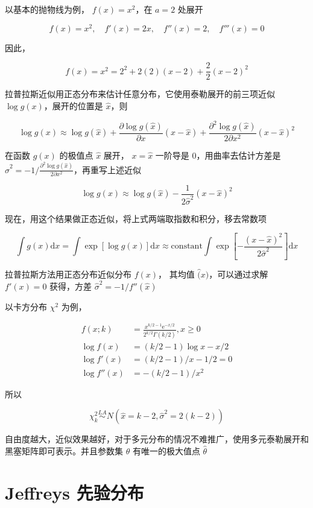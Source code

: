 \documentclass[12pt,a4paper,UTF8,twoside]{book}
\theoremstyle{definition}
\theoremstyle{definition}
\theoremstyle{definition}
\theoremstyle{remark}
\begin{document}
以基本的抛物线为例， \(f(x) = x^2\)，在 \(a = 2\) 处展开

\[ f(x) = x^2, \quad f'(x) = 2x, \quad f''(x) = 2, \quad f'''(x) = 0 \]

因此，

\[ f(x) = x^2 = 2^2 + 2(2)(x-2) + \frac{2}{2}(x-2)^2 \]

拉普拉斯近似用正态分布来估计任意分布，它使用泰勒展开的前三项近似
\(\log g(x)\)，展开的位置是 \(\hat{x}\)，则

\[
\log g(x) \approx \log g(\hat{x}) + \frac{\partial \log g(\hat{x})}{\partial x} (x - \hat{x}) + \frac{\partial^2 \log g(\hat{x})}{2\partial x^2} (x - \hat{x})^2
\]

在函数 \(g(x)\) 的极值点 \(\hat{x}\) 展开， \(x = \hat{x}\) 一阶导是
0，用曲率去估计方差是
\(\hat{\sigma}^2 = -1/\frac{\partial^2 \log g(\hat{x})}{2\partial x^2}\)，再重写上述近似

\[ \log g(x) \approx \log g(\hat{x}) - \frac{1}{2\hat{\sigma}^2} (x - \hat{x})^2 \]

现在，用这个结果做正态近似，将上式两端取指数和积分，移去常数项

\[
\int g(x) \mathrm{d}x = \int \exp[\log g(x)] \mathrm{d}x \approx \mathrm{constant} \int \exp[- \frac{(x - \hat{x})^2}{2\hat{\sigma}^2}] \mathrm{d}x
\]

拉普拉斯方法用正态分布近似分布 \(f(x)\)， 其均值
\(\hat(x)\)，可以通过求解 \(f'(x) = 0\) 获得，方差
\(\hat{\sigma}^2 = -1/f''(\hat{x})\)

以卡方分布 \(\chi^2\) 为例，

\begin{align*}
    f(x; k) & = \frac{ x^{k/2-1} \mathrm{e}^{-x/2} }{ 2^{k/2}\Gamma(k/2) }, x \geq 0 \\
  \log f(x) & = (k/2 - 1) \log x - x/2 \\
 \log f'(x) & = (k/2-1)/x - 1/2 = 0 \\
\log f''(x) & = -(k/2-1)/x^2
\end{align*}

所以

\[ \chi_{k}^2 \overset{LA}{\sim}  N(\hat{x} = k-2, \hat{\sigma}^2 = 2(k-2)) \]

自由度越大，近似效果越好，对于多元分布的情况不难推广，使用多元泰勒展开和黑塞矩阵即可表示。并且参数集
\(\theta\) 有唯一的极大值点 \(\hat{\theta}\) \citep{Tierney1986}

\hypertarget{Jeffreys-prior}{%
\section{Jeffreys 先验分布}\label{Jeffreys-prior}}
\end{document}
